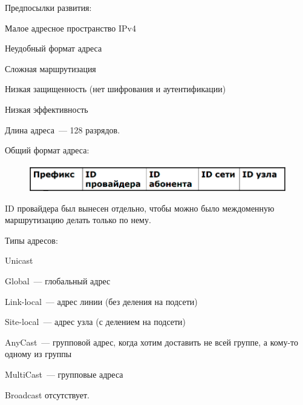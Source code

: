 
Предпосылки развития:
\begin{MyItemize}
    \item Малое адресное пространство IPv4
    \item Неудобный формат адреса
    \item Сложная маршрутизация
    \item Низкая защищенность (нет шифрования и аутентификации)
    \item Низкая эффективность
\end{MyItemize}


Длина адреса~--- 128 разрядов.

Общий формат адреса:

\begin{figure}[H]
  \centering
  \includegraphics[width=15cm]{images/08/01}
\end{figure}

ID провайдера был вынесен отдельно, чтобы можно было междоменную маршрутизацию делать только по нему.

Типы адресов:

\begin{MyItemize}
    \item Unicast
    \begin{MyItemize}
        \item Global~--- глобальный адрес
        \item Link-local~--- адрес линии (без деления на подсети)
        \item Site-local~--- адрес узла (с делением на подсети)
    \end{MyItemize}
    \item AnyCast~--- групповой адрес, когда хотим доставить не всей группе, а кому-то одному из группы
    \item MultiCast~--- групповые адреса
\end{MyItemize}

Broadcast отсутствует.


